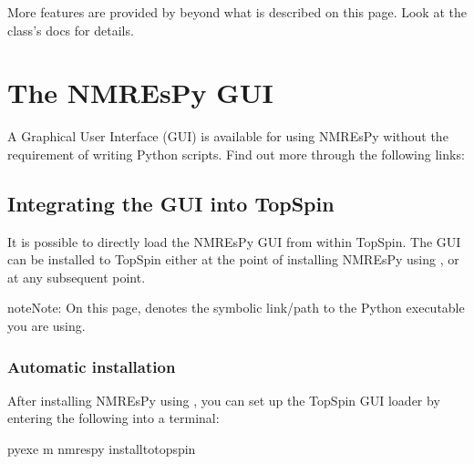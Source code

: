 \documentclass[letterpaper,10pt,english]{sphinxmanual}
\begin{document}
\sphinxAtStartPar
More features are provided by {\hyperref[\detokenize{references/core:nmrespy.core.Estimator}]{}} beyond
what is described on this page. Look at the class’s docs for details.




\chapter{The NMR\sphinxhyphen{}EsPy GUI}
\label{\detokenize{gui/index:the-nmr-espy-gui}}\label{\detokenize{gui/index::doc}}
\sphinxAtStartPar
A Graphical User Interface (GUI) is available for using NMR\sphinxhyphen{}EsPy without
the requirement of writing Python scripts. Find out more through the following
links:




\section{Integrating the GUI into TopSpin}
\label{\detokenize{gui/topspin_install:integrating-the-gui-into-topspin}}\label{\detokenize{gui/topspin_install::doc}}
\sphinxAtStartPar
It is possible to directly load the NMR\sphinxhyphen{}EsPy GUI from within TopSpin. The GUI
can be installed to TopSpin either at the point of installing NMR\sphinxhyphen{}EsPy using
, or at any subsequent point.

\begin{sphinxadmonition}{note}{Note:}
\sphinxAtStartPar
On this page,  denotes the symbolic link/path to the Python
executable you are using.
\end{sphinxadmonition}


\subsection{Automatic installation}
\label{\detokenize{gui/topspin_install:automatic-installation}}
\sphinxAtStartPar
After installing NMR\sphinxhyphen{}EsPy using , you can set up the TopSpin
GUI loader by entering the following into a terminal:

\begin{sphinxVerbatim}[commandchars=\\\{\}]
\PYGZdl{} \PYGZlt{}pyexe\PYGZgt{} \PYGZhy{}m nmrespy \PYGZhy{}\PYGZhy{}install\PYGZhy{}to\PYGZhy{}topspin
\end{sphinxVerbatim}
\end{document}
